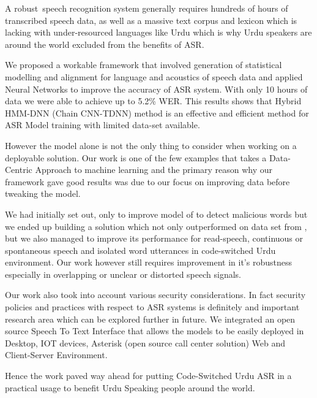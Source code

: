 
A robust speech recognition system generally requires hundreds of hours of transcribed speech data, as well as a massive text corpus and lexicon which is lacking with under-resourced languages like Urdu which is why Urdu speakers are around the world excluded from the benefits of ASR.

We proposed a workable framework that involved generation of statistical modelling and alignment for language and acoustics of speech data and applied Neural Networks to improve the accuracy of ASR system. With only 10 hours of data we were able to achieve up to 5.2\% WER. This results shows that Hybrid HMM-DNN (Chain CNN-TDNN) method is an effective and efficient method for ASR Model training with limited data-set available. 

However the model alone is not the only thing to consider when working on a deployable solution. Our work is one of the few examples that takes a Data-Centric Approach to machine learning and the primary reason why our framework gave good results was due to our focus on improving data before tweaking the model.

We had initially set out, only to improve model of \cite{sehar_gul_detecting_2020} to detect malicious words but we ended up building a solution which not only outperformed on data set from \cite{sehar_gul_detecting_2020,ali_automatic_2015,qureshi_urdu_2021}, but we also managed to improve its performance for read-speech, continuous or spontaneous speech and isolated word utterances in code-switched Urdu environment. Our work however still requires improvement in it's robustness especially in overlapping or unclear or distorted speech signals. 

Our work also took into account various security considerations. In fact security policies and practices with respect to ASR systems is definitely and important research area which can be explored further in future. We integrated an open source Speech To Text Interface that allows the models to be easily deployed in Desktop, IOT devices, Asterisk (open source call center solution) Web and Client-Server Environment. 

Hence the work paved way ahead for putting Code-Switched Urdu ASR in a practical usage to benefit Urdu Speaking people around the world.
